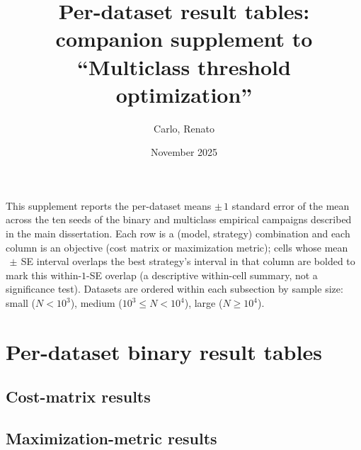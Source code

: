 \documentclass[a4paper,12pt,twoside,brazilian,english]{article}
\title{Per-dataset result tables: companion supplement to\\ ``Multiclass threshold optimization''}
\author{Carlo, Renato}
\date{November 2025}
\begin{document}
\begin{landscape}

\maketitle
\thispagestyle{empty}

\noindent This supplement reports the per-dataset means $\pm\,1$ standard error
of the mean across the ten seeds of the binary and multiclass empirical
campaigns described in the main dissertation. Each row is a (model, strategy)
combination and each column is an objective (cost matrix or maximization
metric); cells whose mean$\,\pm\,$SE interval overlaps the best strategy's
interval in that column are bolded to mark this within-$1$-SE overlap (a
descriptive within-cell summary, not a significance test). Datasets are
ordered within each subsection by sample size: small ($N < 10^3$), medium
($10^3 \leq N < 10^4$), large ($N \geq 10^4$).

\tableofcontents

\clearpage

\section{Per-dataset binary result tables}\label{app:result-tables-binary}

\subsection{Cost-matrix results}
















\subsection{Maximization-metric results}


\end{landscape}
\end{document}
